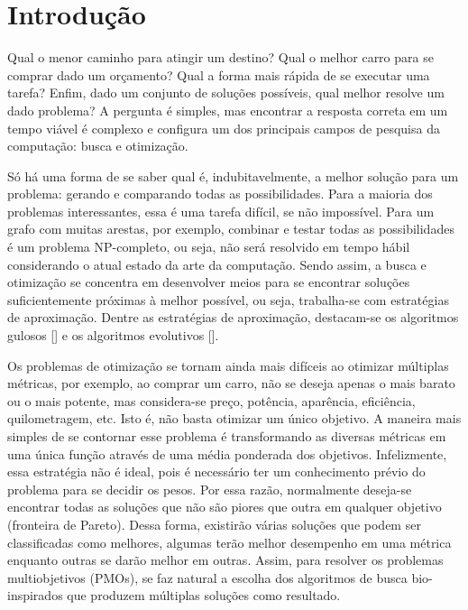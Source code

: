 \chapter[Introdução]{Introdução}

Qual o menor caminho para atingir um destino? Qual o melhor carro para se comprar dado um orçamento? Qual a forma mais rápida de se executar uma tarefa? Enfim, dado um conjunto de soluções possíveis, qual melhor resolve um dado problema? A pergunta é simples, mas encontrar a resposta correta em um tempo viável é complexo e configura um dos principais campos de pesquisa da computação: busca e otimização.

Só há uma forma de se saber qual é, indubitavelmente, a melhor solução para um problema: gerando e comparando todas as possibilidades. Para a maioria dos problemas interessantes, essa é uma tarefa difícil, se não impossível. Para um grafo com muitas arestas, por exemplo, combinar e testar todas as possibilidades é um problema NP-completo, ou seja, não será resolvido em tempo hábil considerando o atual estado da arte da computação. Sendo assim, a busca e otimização se concentra em desenvolver meios para se encontrar soluções suficientemente próximas à melhor possível, ou seja, trabalha-se com estratégias de aproximação. Dentre as estratégias de aproximação, destacam-se os algoritmos gulosos [] e os algoritmos evolutivos [].

Os problemas de otimização se tornam ainda mais difíceis ao otimizar múltiplas métricas, por exemplo, ao comprar um carro, não se deseja apenas o mais barato ou o mais potente, mas considera-se preço, potência, aparência, eficiência, quilometragem, etc. Isto é, não basta otimizar um único objetivo. A maneira mais simples de se contornar esse problema é transformando as diversas métricas em uma única função através de uma média ponderada dos objetivos. Infelizmente, essa estratégia não é ideal, pois é necessário ter um conhecimento prévio do problema para se decidir os pesos. Por essa razão, normalmente deseja-se encontrar todas as soluções que não são piores que outra em qualquer objetivo (fronteira de Pareto). Dessa forma, existirão várias soluções que podem ser classificadas como melhores, algumas terão melhor desempenho em uma métrica enquanto outras se darão melhor em outras. Assim, para resolver os problemas multiobjetivos (PMOs), se faz natural a escolha dos algoritmos de busca bio-inspirados que produzem múltiplas soluções como resultado.

